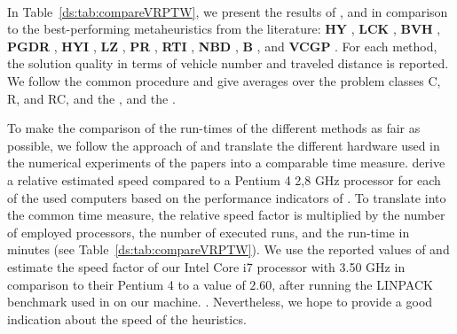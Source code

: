 \documentclass[11pt,a4paper,fleqn]{article}
\begin{document}
\paragraph*{}
In Table~\ref{ds:tab:compareVRPTW}, we present the results of \tsnew, and \tscomplete in comparison to the best-performing metaheuristics from the literature: \textbf{HY} \citep*{hashimoto:08:path}, \textbf{LCK} \citep*{bouthillier:05b}, \textbf{BVH} \citep*{bent:04}, \textbf{PGDR} \citep*{prescott:09}, \textbf{HYI} \citep*{hashimoto:08:iterated}, \textbf{LZ} \citep*{lim:07}, \textbf{PR} \citep*{pisinger:07}, \textbf{RTI} \citep*{repoussis:09}, \textbf{NBD} \citep*{nagata:10}, \textbf{B} \citep*{braysy:03}, and \textbf{VCGP} \citep*{vidal:13}. For each method, the solution quality in terms of vehicle number and traveled distance is reported. We follow the common procedure and give averages over the problem classes C, R, and RC, and the \cnvs, and the \ctds. 


To make the comparison of the run-times of the different methods as fair as possible, we follow the approach of \citet{gendreau:10:vrptw} and translate the different hardware used in the numerical experiments of the papers into a comparable time measure. \citet{gendreau:10:vrptw} derive a relative estimated speed compared to a Pentium 4 2,8 GHz processor for each of the used computers based on the performance indicators of \citet{dongarra:11}.  To translate into the common time measure, the relative speed factor is multiplied by the number of employed processors, the number of executed runs, and the run-time in minutes (see Table~\ref{ds:tab:compareVRPTW}). We use the reported values of \citet{gendreau:10:vrptw} and estimate the speed factor of our Intel Core i7 processor with 3.50 GHz in comparison to their Pentium 4 to a value of $2.60$, after running the LINPACK benchmark used in \citet{dongarra:11} on our machine. . Nevertheless, we hope to provide a good indication about the speed of the heuristics. 
\end{document}
